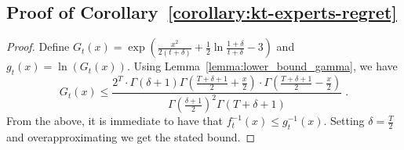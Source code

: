 \subsection{Proof of Corollary~\ref{corollary:kt-experts-regret}}

\begin{proof}
Define $G_t(x)=\exp\left(\frac{x^2}{2(t+\delta)} +\frac{1}{2} \ln \frac{1+\delta}{t+\delta} -3\right)$ and $g_t(x)=\ln(G_t(x))$.
Using Lemma~\ref{lemma:lower_bound_gamma}, we have
\[
G_t(x) \leq \frac{2^T \cdot \Gamma(\delta+1) \Gamma \left(\frac{T+\delta+1}{2} + \frac{x}{2} \right) \cdot \Gamma \left(\frac{T+\delta+1}{2} - \frac{x}{2} \right)}{ \Gamma(\frac{\delta+1}{2})^2 \Gamma(T+\delta+1)} \;.
\]
From the above, it is immediate to have that $f^{-1}_t(x) \leq g^{-1}_t(x)$.
Setting $\delta=\frac{T}{2}$ and overapproximating we get the stated bound.
\end{proof}
